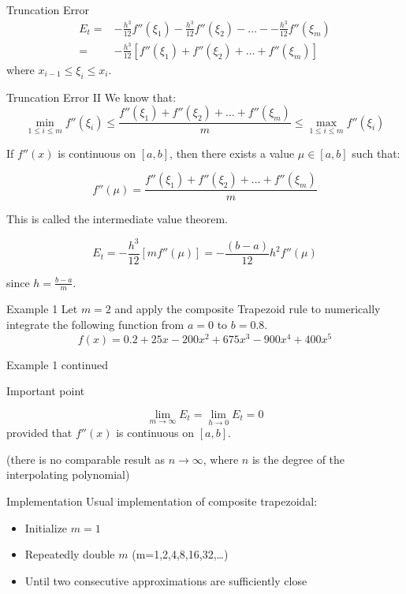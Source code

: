 \documentclass[12pt]{beamer}
\begin{document}
\begin{frame}{Truncation Error}
\begin{align*} 
E_t =& -\frac{h^3}{12} f''(\xi_1) -\frac{h^3}{12} f''(\xi_2) - \dots - -\frac{h^3}{12} f''(\xi_m)  \\
=& -\frac{h^3}{12} \left [ f''(\xi_1) + f''(\xi_2) + \dots + f''(\xi_m) \right ] 
\end{align*} 
where $x_{i-1} \leq \xi_i \leq x_i$. 
\end{frame} 

\begin{frame}{Truncation Error II} 
We know that: 
\[
\min_{1 \leq i \leq m} f''(\xi_i) \leq \frac{f''(\xi_1) + f''(\xi_2) + \dots + f''(\xi_m)}{m} \leq \max_{1 \leq i \leq m} f''(\xi_i) 
\]

If $f''(x)$ is continuous on $[a,b]$, then there exists a value $\mu \in [a,b]$ such that: 

\[
f''(\mu) = \frac{f''(\xi_1) + f''(\xi_2) + \dots + f''(\xi_m)}{m} 
\]

This is called the intermediate value theorem. 

\[
E_t = - \frac{h^3}{12} [ m f''(\mu)] = - \frac{(b-a)}{12} h^2 f''(\mu) 
\]

since $h = \frac{b-a}{m}$. 
\end{frame} 

\begin{frame}{Example 1}
Let $m=2$ and apply the composite Trapezoid rule to numerically integrate the following function from $a=0$ to $b=0.8$.
\[
f(x)=0.2+25x-200x^2+675x^3-900x^4+400x^5
\]
\vspace{3 in}
\end{frame}

\begin{frame}{Example 1 continued}

\end{frame}

\begin{frame}{Important point} 

\[\lim_{m \rightarrow \infty} E_t = \lim_{h \rightarrow 0} E_t = 0
\]
provided that $f''(x)$ is continuous on $[a,b]$. 

\noindent 
(there is no comparable result as $n \rightarrow \infty$, where $n$ is the degree of the interpolating polynomial) 
\end{frame} 

\begin{frame}{Implementation} 
Usual implementation of composite trapezoidal: 
\begin{itemize} 
\item Initialize $m=1$ 
\item Repeatedly double $m$ (m=1,2,4,8,16,32,\dots )
\item Until two consecutive approximations are sufficiently close 
\end{itemize} 
\end{frame} 
\end{document}
